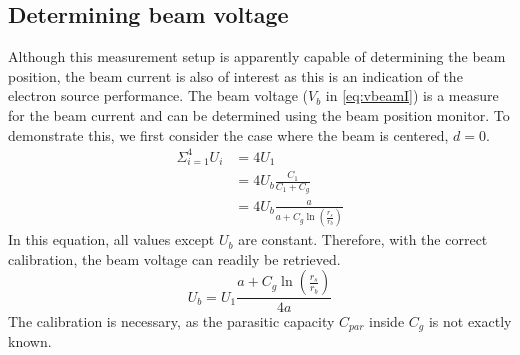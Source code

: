 \subsection{Determining beam voltage}
Although this measurement setup is apparently capable of determining the beam position, the beam current is also of interest as this is an indication of the electron source performance.
The beam voltage ($V_b$ in \ref{eq:vbeamI}) is a measure for the beam current and can be determined using the beam position monitor. To demonstrate this, we first consider the case where the beam is centered, $d=0$.
\begin{align}
\Sigma_{i=1}^4 U_i &= 4U_1 \nonumber\\
 &= 4U_b\frac{C_1}{C_1+C_g} \nonumber\\
 &= 4U_b\frac{a}{a+C_g\ln\left(\frac{r_s}{r_b}\right)}
\end{align}
In this equation, all values except $U_b$ are constant. Therefore, with the correct calibration, the beam voltage can readily be retrieved.
\begin{equation}
U_b =U_1\frac{a+C_g\ln\left(\frac{r_s}{r_b}\right)}{4a} \label{eq:beamvoltagemeas}
\end{equation}
The calibration is necessary, as the parasitic capacity $C_{par}$ inside $C_g$ is not exactly known.

